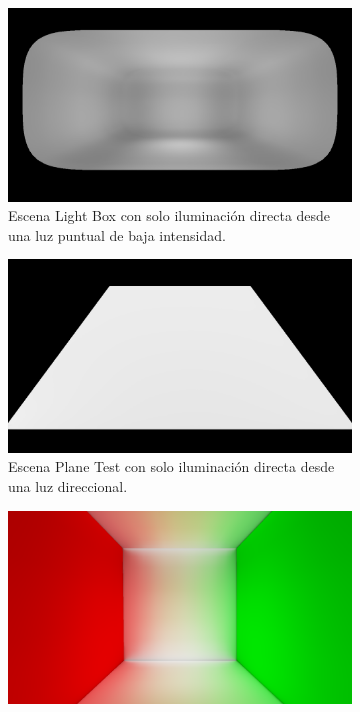 \begin{figure}[H]
	\centering
	\begin{subfigure}[t]{0.32\textwidth}
		\centering
		\captionsetup{justification=centering}
		\includegraphics[width=\linewidth]{media/scenes/lightbox.png}
		\caption*{Escena Light Box con solo iluminación directa desde una luz puntual de baja intensidad.}
	\end{subfigure}%
		\hspace{0.01\textwidth}
	\begin{subfigure}[t]{0.32\textwidth}
		\centering
		\captionsetup{justification=centering}
		\includegraphics[width=\linewidth]{media/scenes/plane.png}
		\caption*{Escena Plane Test con solo iluminación directa desde una luz direccional.}
	\end{subfigure}%
		\hspace{0.01\textwidth}
	\begin{subfigure}[t]{0.32\textwidth}
		\centering
		\captionsetup{justification=centering}
		\includegraphics[width=\linewidth]{media/scenes/cornell_empty.png}

\end{subfigure}
\end{figure}
